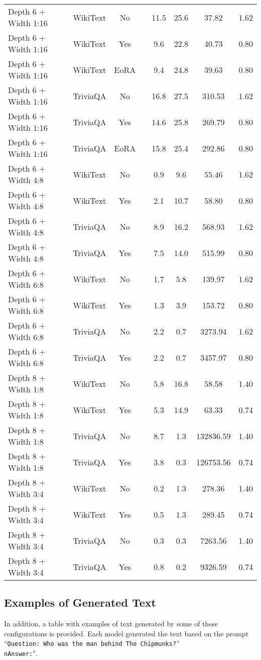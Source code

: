 \begin{longtable}{lcclcccc}
Depth 6 + Width 1:16 & WikiText & No & & 11.5 & 25.6 & 37.82 & 1.62 \\
Depth 6 + Width 1:16 & WikiText & Yes & & 9.6 & 22.8 & 40.73 & 0.80 \\
Depth 6 + Width 1:16 & WikiText & EoRA & & 9.4 & 24.8 & 39.63 & 0.80 \\
Depth 6 + Width 1:16 & TriviaQA & No & & 16.8 & 27.5 & 310.53 & 1.62 \\
Depth 6 + Width 1:16 & TriviaQA & Yes & & 14.6 & 25.8 & 269.79 & 0.80 \\
Depth 6 + Width 1:16 & TriviaQA & EoRA & & 15.8 & 25.4 & 292.86 & 0.80 \\
Depth 6 + Width 4:8 & WikiText & No & & 0.9 & 9.6 & 55.46 & 1.62 \\
Depth 6 + Width 4:8 & WikiText & Yes & & 2.1 & 10.7 & 58.80 & 0.80 \\
Depth 6 + Width 4:8 & TriviaQA & No & & 8.9 & 16.2 & 568.93 & 1.62 \\
Depth 6 + Width 4:8 & TriviaQA & Yes & & 7.5 & 14.0 & 515.99 & 0.80 \\
Depth 6 + Width 6:8 & WikiText & No & & 1.7 & 5.8 & 139.97 & 1.62 \\
Depth 6 + Width 6:8 & WikiText & Yes & & 1.3 & 3.9 & 153.72 & 0.80 \\
Depth 6 + Width 6:8 & TriviaQA & No & & 2.2 & 0.7 & 3273.94 & 1.62 \\
Depth 6 + Width 6:8 & TriviaQA & Yes & & 2.2 & 0.7 & 3457.97 & 0.80 \\
Depth 8 + Width 1:8 & WikiText & No & & 5.8 & 16.8 & 58.58 & 1.40 \\
Depth 8 + Width 1:8 & WikiText & Yes & & 5.3 & 14.9 & 63.33 & 0.74 \\
Depth 8 + Width 1:8 & TriviaQA & No & & 8.7 & 1.3 & 132836.59 & 1.40 \\
Depth 8 + Width 1:8 & TriviaQA & Yes & & 3.8 & 0.3 & 126753.56 & 0.74 \\
Depth 8 + Width 3:4 & WikiText & No & & 0.2 & 1.3 & 278.36 & 1.40 \\
Depth 8 + Width 3:4 & WikiText & Yes & & 0.5 & 1.3 & 289.45 & 0.74 \\
Depth 8 + Width 3:4 & TriviaQA & No & & 0.3 & 0.3 & 7263.56 & 1.40 \\
Depth 8 + Width 3:4 & TriviaQA & Yes & & 0.8 & 0.2 & 9326.59 & 0.74 \\


\end{longtable}
\normalsize

\subsection{Examples of Generated Text}
In addition, a table with examples of text generated by some of these configurations is provided. Each model generated the text based on the prompt ``\texttt{Question: Who was the man behind The Chipmunks?\char`\\nAnswer:}".

